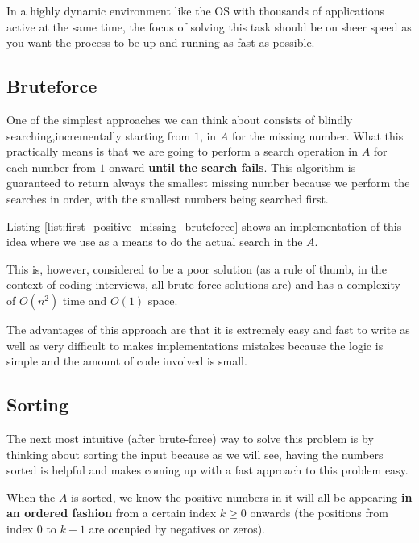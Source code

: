 In a highly dynamic environment like the OS with thousands of applications active at the same time, the focus of solving this task should be on sheer speed as you want the process to be up and running as fast as possible. 

\subsection{Bruteforce}
One of the simplest approaches we can think about consists of blindly searching,incrementally starting from $1$, in $A$ for the missing number. 
What this practically means is that we are going to perform a search operation in $A$
for each number from $1$ onward \textbf{until the search fails}. This algorithm is guaranteed to return always the smallest missing number because we perform the searches in order, with the smallest numbers being searched first. 

Listing
\ref{list:first_positive_missing_bruteforce} shows an implementation of this idea where we use  as a means to do the actual search in the $A$. 
 


This is, however, considered to be a poor solution (as a rule of thumb, in the context of coding interviews, all brute-force solutions are) and has a
complexity of $O(n^2)$ time and $O(1)$ space.

The advantages of this approach are that it is extremely
easy and fast to write as well as very difficult to makes implementations mistakes because the logic is simple and the amount of code involved is small.

\subsection{Sorting}
\label{first_positive_missing:sec:sorting}

The next most intuitive (after brute-force) way to solve this problem is by thinking about sorting the input because as we will see, having the numbers sorted is helpful and makes coming up with a fast approach to this problem easy.

When the $A$ is sorted, we know the positive numbers in it will all be appearing \textbf{in an ordered fashion} from a certain index $k\geq 0$ onwards (the positions from index $0$ to $k-1$ are occupied by negatives or zeros). 

